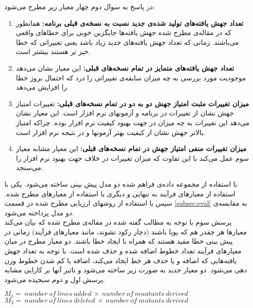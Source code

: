 در پاسخ به سوال دوم چهار معیار زیر مطرح می‌شود:
\begin{enumerate}

	\item  
	\textbf{
	تعداد جهش یافته‌های تولید شده‌ی جدید نسبت به نسخه‌ی قبلی برنامه: }همانطور که در مقاله‌ی \cite{just2014mutants} مطرح شده جهش یافته‌ها جایگزین خوبی برای خطاهای واقعی می‌باشند. زمانی که تعداد جهش یافته‌های جدید زیاد باشد یعنی تغییراتی که خطا خیز تر هستند بیشتر است. 
	\item 
	\textbf{
	تعداد جهش یافته‌های متمایز در تمام نسخه‌های قبلی:} این معیار نشان می‌دهد موجودیت مورد بررسی به چه میزان سابقه‌ی تغییراتی را درد که احتمال بروز خطا را افزایش می‌دهد.
	
	\item 
	\textbf{
	میزان تغییرات مثبت امتیاز جهش دو به دو در تمام نسخه‌های قبلی:}
تغییرات امتیاز جهش نشان از تغییرات در برنامه و آزمونهای نرم افزار است.     این معیار نشان می‌دهد این تغییرات به چه میزان در جهت بهبود کیفیت نرم افزار بوده. چراکه امتیاز بالاتر جهش نشان از کیفیت بهتر آزمونها و در نتیجه نرم افزار است. 
	\item 
	\textbf{
	میزان تغییرات منفی امتیاز جهش در تمام نسخه‌های قبلی:}
این معیار مشابه معیار سوم عمل می‌کند با این تفاوت که میزان تغییرات در خلاف جهت بهبود نرم افزار را می‌سنجد. 	
\end{enumerate}
با استفاده از مجموعه داده‌ی فراهم شده دو مدل پیش بینی ساخته می‌شود. یکی با استفاده از معیارهای فرآیند به تنهایی و دیگری با استفاده از معیارهای مطرح شده. سپس با استفاده از روشهای ارزیابی مطرح شده در قسمت \ref{subsec:eval}  به مقایسه‌ی دو مدل پرداخته می‌شود.\\

پرسش سوم با توجه به مطالب گفته شده در مقاله‌ی \cite{rahman2013and} مطرح شده که بیان می‌کند معیارها هر چقدر هم که پویا باشند (دچار رکود نشوند، مانند معیارهای فرآیند) زمانی در پیش بینی خطا مفید هستند که همراه با ایجاد خطا باشند.  دو معیار مطرح در میان معیارهای فرآیند تعداد خطوط اضافه شده و حذف شده است. با توجه به تعداد جهش یافته‌هایی که  اضافه  و یا حذف هر خط ایجاد می‌کند، اضافه یا کم شدن خطوط وزن دهی می‌شود. دو معیار جدید به صورت زیر ساخته می‌شود و تاثیر آنها بر کارایی مشابه پرسش اول و دوم سنجیده می‌شود. \\
\begin{latin}
	
	$M_1 =\ number\ of\ lines\ added\ \times \ number\ of\ muatants\ derived$\\
	
	$M_2 =\ number\ of\ lines\ deleted\ \times \ number\ of\ mutants\ derived$\\
\end{latin}



 